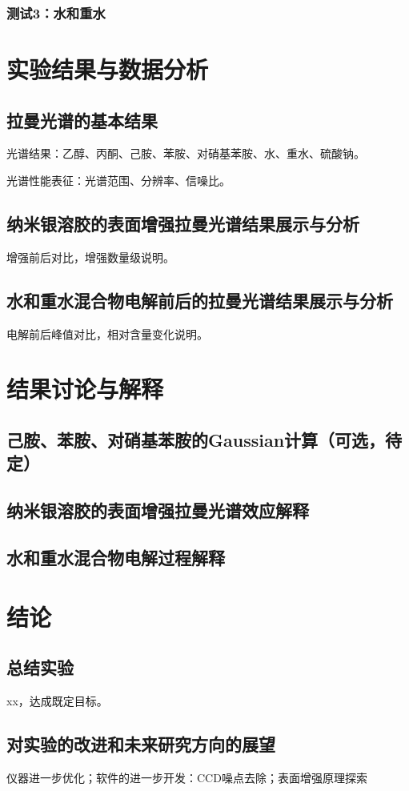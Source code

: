 \documentclass[UTF8]{article}
\begin{document}
	\subsubsection{测试3：水和重水}

	
	\section{实验结果与数据分析}
	\subsection{拉曼光谱的基本结果}
	光谱结果：乙醇、丙酮、己胺、苯胺、对硝基苯胺、水、重水、硫酸钠。

	光谱性能表征：光谱范围、分辨率、信噪比。

	\subsection{纳米银溶胶的表面增强拉曼光谱结果展示与分析}
	增强前后对比，增强数量级说明。

	\subsection{水和重水混合物电解前后的拉曼光谱结果展示与分析}
	电解前后峰值对比，相对含量变化说明。

	
	\section{结果讨论与解释}
	\subsection{己胺、苯胺、对硝基苯胺的Gaussian计算（可选，待定）}

	\subsection{纳米银溶胶的表面增强拉曼光谱效应解释}

	\subsection{水和重水混合物电解过程解释 }

	
	\section{结论}
	\subsection{总结实验}
	xx，达成既定目标。

	\subsection{对实验的改进和未来研究方向的展望}
	仪器进一步优化；软件的进一步开发：CCD噪点去除；表面增强原理探索
	
	
	
	


	
\end{document}
